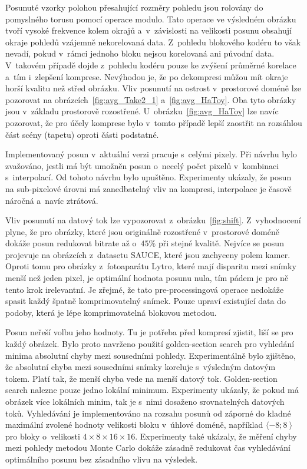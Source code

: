 Posunuté vzorky polohou přesahující roz\-měry po\-hledu jsou rolovány do pomyslného torusu pomocí operace modulo.
Tato operace ve výsledném obrázku tvoří vysoké frekvence kolem okrajů a~v~zá\-vislosti na velikosti posunu obsahují okraje po\-hledů vzájemně nekorelovaná data.
Z~po\-hledu blokového kodéru to však nevadí, pokud v~rámci jednoho bloku nejsou korelovaná ani původní data.
V~takovém případě dojde z~po\-hledu kodéru pouze ke zvýšení průměrné korelace a~tím i~zlepšení kom\-pre\-se.
Nevýhodou je, že po dekom\-pre\-si můžou mít okraje horší kvalitu než střed obrázku.
Vliv posunutí na ostrost v~pro\-s\-torové doméně lze pozorovat na obrázcích~\ref{fig:avg_Take2_1} a~\ref{fig:avg_HaToy}.
Oba tyto obrázky jsou v~základu pro\-s\-torově rozostřené.
U~obrázku~\ref{fig:avg_HaToy} lze navíc pozorovat, že pro účely kom\-pre\-se bylo v~tomto případě lepší zaostřit na rozsáhlou část scény (tapetu) oproti části podstatné.

Implementovaný posun v~aktuální verzi pracuje s~celými pixely.
Při návrhu bylo zvažováno, jestli má být umožněn posun o~necelý počet pixelů v~kom\-bi\-na\-ci s~interpolací.
Od tohoto návrhu bylo upuštěno.
Experimenty ukázaly, že posun na sub-pixelové úrovni má zanedbatelný vliv na kom\-pre\-si, interpolace je časově náročná a~navíc ztrátová.

Vliv posunutí na datový tok lze vypozorovat z~ob\-ráz\-ku~\ref{fig:shift}.
Z~vyhodnocení plyne, že pro obrázky, které jsou originálně rozostřené v~pro\-s\-torové doméně dokáže posun redukovat bitrate až o~$45 \%$ při stejné kvalitě.
Nejvíce se posun projevuje na obrázcích z~datasetu SAUCE, které jsou zachyceny polem kamer.
Oproti tomu pro obrázky z~fotoaparátu Lytro, které mají disparitu mezi snímky menší než jeden pixel, je optimální hodnota posunu nula, tím pádem je pro ně tento krok irelevantní.
Je zřejmé, že tato pre-processingová operace nedokáže spasit každý špatně komprimovatelný snímek.
Pouze upraví existující data do podoby, která je lépe komprimovatelná blokovou me\-to\-dou.

Posun neřeší volbu jeho hodnoty.
Tu je potřeba před kom\-pre\-sí zjistit, liší se pro každý obrázek.
Bylo proto navrženo použití golden-section search pro vyhledání minima absolutní chyby mezi sousedními po\-hledy.
Experimentálně bylo zjištěno, že absolutní chyba mezi sousedními snímky koreluje s~výsledným datovým tokem.
Platí tak, že menší chyba vede na menší datový tok.
Golden-section search nalezne pouze jedno lokální minimum.
Experimenty ukázaly, že pokud má obrázek více lokálních minim, tak je s~nimi dosaženo srovnatelných datových toků.
Vyhledávání je implementováno na rozsahu posunů od záporné do kladné maximální zvolené hodnoty velikosti bloku v~úhlové doméně, například $\langle -8; 8~\rangle$ pro bloky o~velikosti $4\times8\times16\times16$.
Experimenty také ukázaly, že měření chyby mezi po\-hledy me\-to\-dou Monte Carlo dokáže zásadně redukovat čas vyhledávání optimálního posunu bez zásadního vlivu na výsledek.

